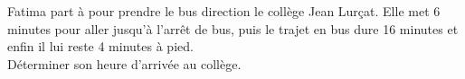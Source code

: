 \begin{exercice*}
   Fatima part à  pour prendre le bus direction le collège Jean Lurçat. Elle met 6 minutes pour aller jusqu'à l'arrêt de bus, puis le trajet en bus dure 16 minutes et enfin il lui reste 4 minutes à pied. \\
   Déterminer son heure d'arrivée au collège.
\end{exercice*}